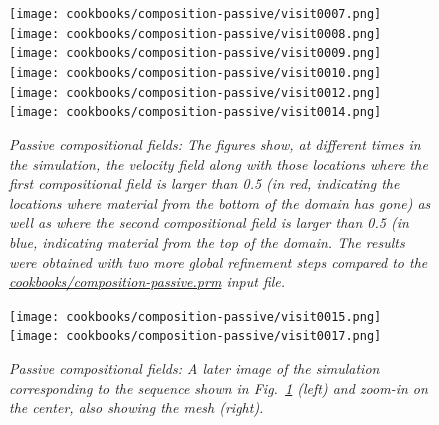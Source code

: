 \documentclass{article}
\begin{document}
\begin{figure}
  \centering
  \texttt{[image: cookbooks/composition-passive/visit0007.png]}
  \hfill
  \texttt{[image: cookbooks/composition-passive/visit0008.png]}
  \hfill
  \texttt{[image: cookbooks/composition-passive/visit0009.png]}
  \\
  \texttt{[image: cookbooks/composition-passive/visit0010.png]}
  \hfill
  \texttt{[image: cookbooks/composition-passive/visit0012.png]}
  \hfill
  \texttt{[image: cookbooks/composition-passive/visit0014.png]}
  \caption{\it Passive compositional fields: The figures show, at
    different times in the simulation, the velocity field along with
    those locations where the first compositional field is larger than
    0.5 (in red, indicating the locations where material from the bottom
    of the domain has gone) as well as where the second compositional
    field is larger than 0.5 (in blue, indicating material from the top
    of the domain. The results were obtained with two more global
    refinement steps compared to the
    \url{cookbooks/composition-passive.prm} input file.}
  \label{fig:compositional-passive}
\end{figure}

\begin{figure}
  \centering
  \texttt{[image: cookbooks/composition-passive/visit0015.png]}
  \hfill
  \texttt{[image: cookbooks/composition-passive/visit0017.png]}
  \caption{\it Passive compositional fields: A later image of the simulation
    corresponding to the sequence shown in
    Fig.~\ref{fig:compositional-passive} (left) and zoom-in on the
    center, also showing the mesh (right).}
  \label{fig:compositional-passive-zoom}
\end{figure}
\end{document}
